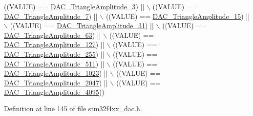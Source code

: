 \begin{DoxyCode}
                                                      ((VALUE) == 
      \hyperlink{group___d_a_c__lfsrunmask__triangleamplitude_ga9798d68c3bbf0a57306bf2f962697377}{DAC\_TriangleAmplitude\_3}) || \(\backslash\)
                                                      ((VALUE) == 
      \hyperlink{group___d_a_c__lfsrunmask__triangleamplitude_gad3f31de1277836df1109576a53c47e87}{DAC\_TriangleAmplitude\_7}) || \(\backslash\)
                                                      ((VALUE) == 
      \hyperlink{group___d_a_c__lfsrunmask__triangleamplitude_ga42653712ce783d33ecb2f3e97e9c2ece}{DAC\_TriangleAmplitude\_15}) || \(\backslash\)
                                                      ((VALUE) == 
      \hyperlink{group___d_a_c__lfsrunmask__triangleamplitude_ga10b15745b749c62a56bd3d7bd5a27e1b}{DAC\_TriangleAmplitude\_31}) || \(\backslash\)
                                                      ((VALUE) == 
      \hyperlink{group___d_a_c__lfsrunmask__triangleamplitude_gaaae92dae9c4da55e29c645396825e36b}{DAC\_TriangleAmplitude\_63}) || \(\backslash\)
                                                      ((VALUE) == 
      \hyperlink{group___d_a_c__lfsrunmask__triangleamplitude_gaacec0af3f69db46f8984be3af9ecadfb}{DAC\_TriangleAmplitude\_127}) || \(\backslash\)
                                                      ((VALUE) == 
      \hyperlink{group___d_a_c__lfsrunmask__triangleamplitude_gadb404422c86a7b92d78e6d9617e8ce4d}{DAC\_TriangleAmplitude\_255}) || \(\backslash\)
                                                      ((VALUE) == 
      \hyperlink{group___d_a_c__lfsrunmask__triangleamplitude_ga565b0c97bbdf152756617d491bf8ef85}{DAC\_TriangleAmplitude\_511}) || \(\backslash\)
                                                      ((VALUE) == 
      \hyperlink{group___d_a_c__lfsrunmask__triangleamplitude_ga7d573b0cebb1b939bd83367effb93d89}{DAC\_TriangleAmplitude\_1023}) || \(\backslash\)
                                                      ((VALUE) == 
      \hyperlink{group___d_a_c__lfsrunmask__triangleamplitude_gad33d28d7fcc09d84500ea9b6e6c5feed}{DAC\_TriangleAmplitude\_2047}) || \(\backslash\)
                                                      ((VALUE) == 
      \hyperlink{group___d_a_c__lfsrunmask__triangleamplitude_ga3ce69f5a63a2464dc4b5f73cb6fe72f5}{DAC\_TriangleAmplitude\_4095}))
\end{DoxyCode}


Definition at line 145 of file stm32f4xx\-\_\-dac.\-h.

